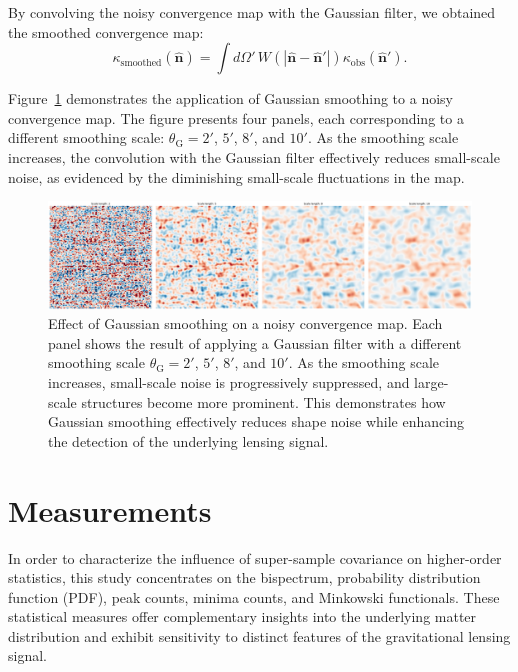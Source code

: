 By convolving the noisy convergence map with the Gaussian filter, we obtained the smoothed convergence map:
\begin{equation}
    \kappa_{\mathrm{smoothed}}(\hat{\mathbf{n}}) = \int d\Omega' \, W(|\hat{\mathbf{n}} - \hat{\mathbf{n}}'|) \kappa_{\mathrm{obs}}(\hat{\mathbf{n}}').
\end{equation}

Figure~\ref{fig:smoothing} demonstrates the application of Gaussian smoothing to a noisy convergence map. The figure presents four panels, each corresponding to a different smoothing scale: $\theta_{\mathrm{G}} = 2'$, $5'$, $8'$, and $10'$. As the smoothing scale increases, the convolution with the Gaussian filter effectively reduces small-scale noise, as evidenced by the diminishing small-scale fluctuations in the map. 
\begin{figure}[ht]
    \centering
    \includegraphics[width=\textwidth]{figures/smoothed_comparison.png}
    \caption{Effect of Gaussian smoothing on a noisy convergence map. Each panel shows the result of applying a Gaussian filter with a different smoothing scale $\theta_{\mathrm{G}} = 2'$, $5'$, $8'$, and $10'$. As the smoothing scale increases, small-scale noise is progressively suppressed, and large-scale structures become more prominent. This demonstrates how Gaussian smoothing effectively reduces shape noise while enhancing the detection of the underlying lensing signal.}
\label{fig:smoothing}
\end{figure}

\section{Measurements}
In order to characterize the influence of super-sample covariance on higher-order statistics, this study concentrates on the bispectrum, probability distribution function (PDF), peak counts, minima counts, and Minkowski functionals. These statistical measures offer complementary insights into the underlying matter distribution and exhibit sensitivity to distinct features of the gravitational lensing signal.

